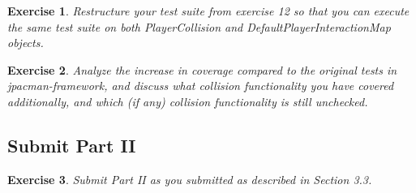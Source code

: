 \documentclass[a4paper]{article}
\newtheorem{thm}{Exercise}
\begin{document}
    \begin{thm}
      Restructure your test suite from exercise 12 so that you can execute the same test
      suite on both PlayerCollision and DefaultPlayerInteractionMap objects.
    \end{thm}
    
    \begin{thm}
      Analyze the increase in coverage compared to the original tests in jpacman-framework,
      and discuss what collision functionality you have covered additionally,
      and which (if any) collision functionality is still unchecked.
    \end{thm}
  
  \subsection{Submit Part II}
    \begin{thm}
      Submit Part II as you submitted as described in Section 3.3.
    \end{thm}
\end{document}
